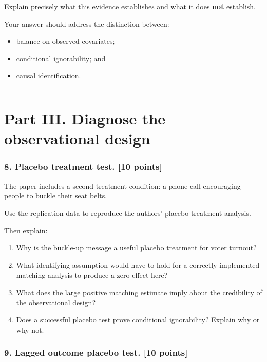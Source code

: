 \documentclass[
]{article}
\providecommand{\tightlist}{%
  \setlength{\itemsep}{0pt}\setlength{\parskip}{0pt}}
\begin{document}
Explain precisely what this evidence establishes and what it does
\textbf{not} establish.

Your answer should address the distinction between:

\begin{itemize}
\tightlist
\item
  balance on observed covariates;
\item
  conditional ignorability; and
\item
  causal identification.
\end{itemize}

\begin{center}\rule{0.5\linewidth}{0.5pt}\end{center}

\section{Part III. Diagnose the observational
design}\label{part-iii.-diagnose-the-observational-design}

\subsubsection{8. Placebo treatment test. {[}10
points{]}}\label{placebo-treatment-test.-10-points}

The paper includes a second treatment condition: a phone call
encouraging people to buckle their seat belts.

Use the replication data to reproduce the authors' placebo-treatment
analysis.

Then explain:

\begin{enumerate}
\def\labelenumi{\arabic{enumi}.}
\tightlist
\item
  Why is the buckle-up message a useful placebo treatment for voter
  turnout?
\item
  What identifying assumption would have to hold for a correctly
  implemented matching analysis to produce a zero effect here?
\item
  What does the large positive matching estimate imply about the
  credibility of the observational design?
\item
  Does a successful placebo test prove conditional ignorability? Explain
  why or why not.
\end{enumerate}

\subsubsection{9. Lagged outcome placebo test. {[}10
points{]}}\label{lagged-outcome-placebo-test.-10-points}
\end{document}
